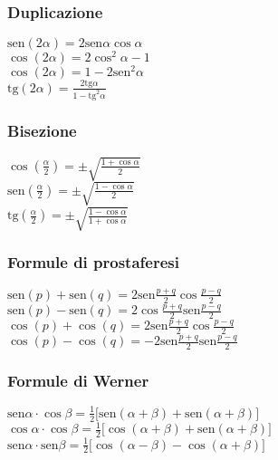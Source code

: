 \documentclass[a4paper,12pt]{article}
\newcommand{\sen}{\textrm{sen}}
\newcommand{\tg}{\textrm{tg}}
\begin{document}
\begin{multicols}{2}
  		\subsubsection{Duplicazione}
			$\sen(2\alpha)=2\sen\alpha\cos\alpha$\\[0.5em]
			$\cos(2\alpha)=2\cos^2\alpha-1$\\[0.5em]
			$\cos(2\alpha)=1-2\sen^2\alpha$\\[0.5em]
			$\tg(2\alpha)=\frac{2\tg\alpha}{1-\tg^2\alpha}$
  		\subsubsection{Bisezione}
			$\cos(\frac{\alpha}{2})=\pm\sqrt{\frac{1+\cos\alpha}{2}}$\\[0.5em]
			$\sen(\frac{\alpha}{2})=\pm\sqrt{\frac{1-\cos\alpha}{2}}$\\[0.5em]
			$\tg(\frac{\alpha}{2})=\pm\sqrt{\frac{1-\cos\alpha}{1+\cos\alpha}}$
  		\subsubsection{Formule di prostaferesi}
  		${\sen(p)}+ {\sen(q)}=2\sen\frac{p+q}{2}\cos\frac{p-q}{2}$\\[0.5em]
  		${\sen(p)}-{\sen(q)}=2\cos\frac{p+q}{2}\sen\frac{p-q}{2}$\\[0.5em]
  		${\cos(p)}+ {\cos(q)}=2\sen\frac{p+q}{2}\cos\frac{p-q}{2}$\\[0.5em]
  		${\cos(p)}-{\cos(q)}=-2\sen\frac{p+q}{2}\sen\frac{p-q}{2}$\\[0.5em]
  		\subsubsection{Formule di Werner}
  		${\sen\alpha}\cdot {\cos\beta}=\frac{1}{2}\lbrack \sen(\alpha + \beta)+\sen(\alpha+\beta)\rbrack$\\[0.5em]
  		${\cos\alpha}\cdot {\cos\beta}=\frac{1}{2}\lbrack \cos(\alpha + \beta)+\sen(\alpha+\beta)\rbrack$\\[0.5em]
  		${\sen\alpha}\cdot {\sen\beta}=\frac{1}{2}\lbrack \cos(\alpha - \beta)-\cos(\alpha+\beta)\rbrack$
	\end{multicols}
\tableofcontents
\end{document}
